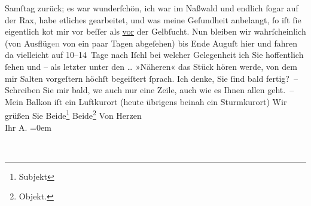 \begin{ledgroupsized}[t]{13cm}
                  Samſtag zurück; es war wunderſchön, {\pb}ich war im Naßwald und endlich ſogar auf der
                  Rax, habe etliches gearbeitet, und was meine
               Geſundheit anbelangt, ſo iſt ſie eigentlich ko{\geminationm}t mir vor
               beſſer als \uline{vor} der Gelbſucht. Nun bleiben wir
               wahrſcheinlich (\introOben{}von\introOben{} Ausflüg\textcolor{gray}{en} von ein
               paar Tagen abge{\pb}ſehen) bis Ende Auguſt
               hier und fahren da{\geminationn} vielleicht auf 10–14 Tage nach Iſchl bei welcher Gelegenheit ich Sie hoffentlich
               ſehen und – als letzter unter den {\dots} »Näheren« das Stück hören werde, von dem mir
                  Salten vorgeſtern höchſt begeiſtert ſprach.
               Ich denke, {\pb}Sie ſind bald fertig? –\pend
           \pstart
           Schreiben Sie mir bald, we{\geminationn} auch nur eine Zeile, auch
               wie es Ihnen allen geht. –\pend
           \pstart
           Mein Balkon iſt ein Luftkurort (heute übrigens beinah ein Sturmkurort)\pend
           \pstart
           Wir grüßen Sie Beide\footnote{\noindent{}Subjekt} Beide\footnote{\noindent{}Objekt.}\pend
           \pstart
           Von Herzen{\\[\baselineskip]}Ihr \spacefill\mbox{A.}\pend
           \leftskip=0em{}
         
         \endnumbering{}\end{ledgroupsized}  \newcommand{\dateiname}{L01420}\newcommand{\titel}{Arthur Schnitzler an Richard Beer-Hofmann, 28. 7. 1904}\newcommand{\editorInnen}{Martin Anton Müller und Gerd-Hermann Susen}
      